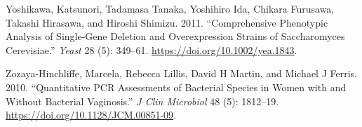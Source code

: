 \documentclass[
]{article}
\newlength{\cslhangindent}
\newlength{\cslentryspacingunit} %
\newenvironment{CSLReferences}[2] %
 {%
  \setlength{\parindent}{0pt}
  \ifodd #1
  \let\oldpar\par
  \def\par{\hangindent=\cslhangindent\oldpar}
  \fi
  \setlength{\parskip}{#2\cslentryspacingunit}
 }%
 {}
\begin{document}
\begin{CSLReferences}{1}{0}
\leavevmode{}%
Yoshikawa, Katsunori, Tadamasa Tanaka, Yoshihiro Ida, Chikara Furusawa,
Takashi Hirasawa, and Hiroshi Shimizu. 2011. {``Comprehensive Phenotypic
Analysis of Single-Gene Deletion and Overexpression Strains of
Saccharomyces Cerevisiae.''} \emph{Yeast} 28 (5): 349--61.
\url{https://doi.org/10.1002/yea.1843}.

\leavevmode{}%
Zozaya-Hinchliffe, Marcela, Rebecca Lillis, David H Martin, and Michael
J Ferris. 2010. {``Quantitative PCR Assessments of Bacterial Species in
Women with and Without Bacterial Vaginosis.''} \emph{J Clin Microbiol}
48 (5): 1812--19. \url{https://doi.org/10.1128/JCM.00851-09}.

\end{CSLReferences}
\end{document}
